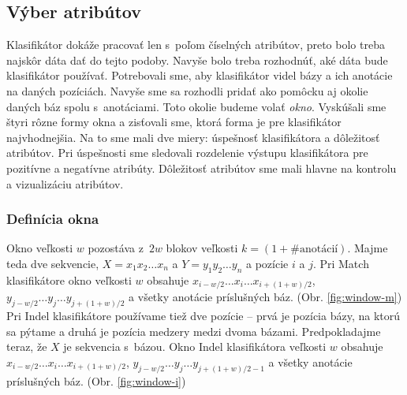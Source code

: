 \subsection{Výber atribútov}
\label{subsec:attribute-selection}

Klasifikátor dokáže pracovať len s~poľom číselných atribútov, preto bolo treba najskôr dáta dať do tejto podoby. Navyše bolo treba rozhodnúť, aké dáta bude klasifikátor používať. Potrebovali sme, aby klasifikátor videl bázy a ich anotácie na daných pozíciách. Navyše sme sa rozhodli pridať ako pomôcku aj okolie daných báz spolu s~anotáciami. Toto okolie budeme volať \textit{okno}. Vyskúšali sme štyri rôzne formy okna a zisťovali sme, ktorá forma je pre klasifikátor najvhodnejšia. Na to sme mali dve miery: úspešnosť klasifikátora a dôležitosť atribútov. Pri úspešnosti sme sledovali rozdelenie výstupu klasifikátora pre pozitívne a negatívne atribúty. Dôležitosť atribútov sme mali hlavne na kontrolu a vizualizáciu atribútov.

\subsubsection{Definícia okna}
Okno veľkosti $w$ pozostáva z~$2w$ blokov veľkosti $k = (1+\#\text{anotácií})$.
Majme teda dve sekvencie, $X = x_1 x_2 \dots x_n$ a $Y = y_1 y_2 \dots y_n$ a pozície $i$ a $j$.
Pri Match klasifikátore okno veľkosti $w$ obsahuje $x_{i - w/2}\dots x_i \dots x_{i + (1 + w)/2}$, $y_{j - w/2}\dots y_j \dots y_{j + (1 + w)/2}$ a všetky anotácie príslušných báz. (Obr. \ref{fig:window-m})
Pri Indel klasifikátore používame tiež dve pozície -- prvá je pozícia bázy, na ktorú sa pýtame a druhá je pozícia medzery medzi dvoma bázami.
Predpokladajme teraz, že $X$ je sekvencia s~bázou. Okno Indel klasifikátora veľkosti $w$ obsahuje $x_{i - w/2}\dots x_i \dots x_{i + (1 + w)/2}$, $y_{j - w/2}\dots y_j \dots y_{j + (1 + w)/2 - 1}$ a všetky anotácie príslušných báz. (Obr. \ref{fig:window-i})

